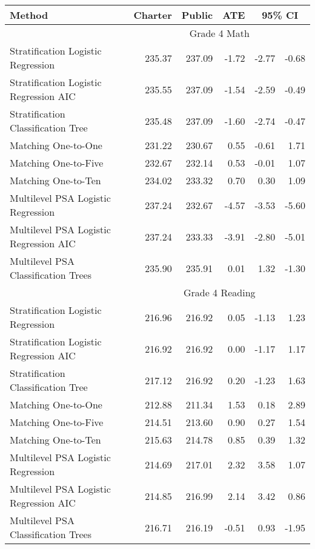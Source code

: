 \begin{table}[ht]
\centering
\begin{tabular}{lrrrrr}
  \hline Method & Charter & Public & ATE & \multicolumn{2}{c}{95\% CI} \\   \hline & \multicolumn{5}{c}{Grade 4 Math} \\ \cline{2-6} Stratification Logistic Regression & 235.37 & 237.09 & -1.72 & -2.77 & -0.68 \\ 
  Stratification Logistic Regression AIC & 235.55 & 237.09 & -1.54 & -2.59 & -0.49 \\ 
  Stratification Classification Tree & 235.48 & 237.09 & -1.60 & -2.74 & -0.47 \\ 
  Matching One-to-One & 231.22 & 230.67 & 0.55 & -0.61 & 1.71 \\ 
  Matching One-to-Five & 232.67 & 232.14 & 0.53 & -0.01 & 1.07 \\ 
  Matching One-to-Ten & 234.02 & 233.32 & 0.70 & 0.30 & 1.09 \\ 
  Multilevel PSA Logistic Regression & 237.24 & 232.67 & -4.57 & -3.53 & -5.60 \\ 
  Multilevel PSA Logistic Regression AIC & 237.24 & 233.33 & -3.91 & -2.80 & -5.01 \\ 
  Multilevel PSA Classification Trees & 235.90 & 235.91 & 0.01 & 1.32 & -1.30 \\ 
    \hline & \multicolumn{5}{c}{Grade 4 Reading} \\ \cline{2-6} Stratification Logistic Regression & 216.96 & 216.92 & 0.05 & -1.13 & 1.23 \\ 
  Stratification Logistic Regression AIC & 216.92 & 216.92 & 0.00 & -1.17 & 1.17 \\ 
  Stratification Classification Tree & 217.12 & 216.92 & 0.20 & -1.23 & 1.63 \\ 
  Matching One-to-One & 212.88 & 211.34 & 1.53 & 0.18 & 2.89 \\ 
  Matching One-to-Five & 214.51 & 213.60 & 0.90 & 0.27 & 1.54 \\ 
  Matching One-to-Ten & 215.63 & 214.78 & 0.85 & 0.39 & 1.32 \\ 
  Multilevel PSA Logistic Regression & 214.69 & 217.01 & 2.32 & 3.58 & 1.07 \\ 
  Multilevel PSA Logistic Regression AIC & 214.85 & 216.99 & 2.14 & 3.42 & 0.86 \\ 
  Multilevel PSA Classification Trees & 216.71 & 216.19 & -0.51 & 0.93 & -1.95 \\ 

\end{tabular}
\end{table}

